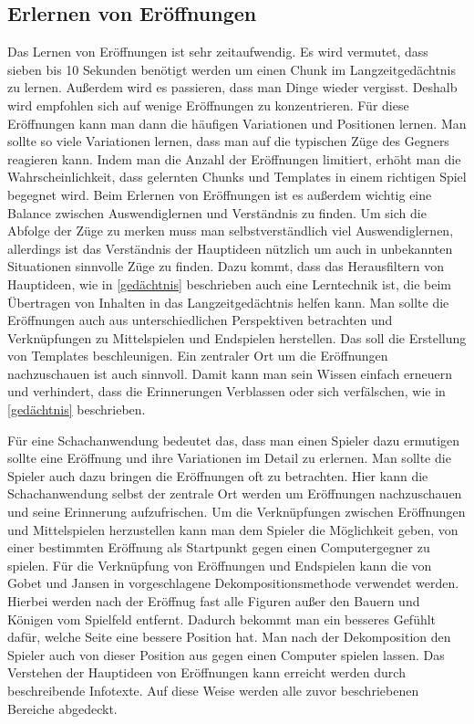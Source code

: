 \subsection{Erlernen von Eröffnungen}
Das Lernen von Eröffnungen ist sehr zeitaufwendig. Es wird vermutet, dass sieben bis 10 Sekunden benötigt werden um einen Chunk im Langzeitgedächtnis zu lernen. Außerdem wird es passieren, dass man Dinge wieder vergisst. Deshalb wird empfohlen sich auf wenige Eröffnungen zu konzentrieren. Für diese Eröffnungen kann man dann die häufigen Variationen und Positionen lernen. Man sollte so viele Variationen lernen, dass man auf die typischen Züge des Gegners reagieren kann. Indem man die Anzahl der Eröffnungen limitiert, erhöht man die Wahrscheinlichkeit, dass gelernten Chunks und Templates in einem richtigen Spiel begegnet wird. Beim Erlernen von Eröffnungen ist es außerdem wichtig eine Balance zwischen Auswendiglernen und Verständnis zu finden. Um sich die Abfolge der Züge zu merken muss man selbstverständlich viel Auswendiglernen, allerdings ist das Verständnis der Hauptideen nützlich um auch in unbekannten Situationen sinnvolle Züge zu finden. Dazu kommt, dass das Herausfiltern von Hauptideen, wie in \autoref{gedächtnis} beschrieben auch eine Lerntechnik ist, die beim Übertragen von Inhalten in das Langzeitgedächtnis helfen kann. Man sollte die Eröffnungen auch aus unterschiedlichen Perspektiven betrachten und Verknüpfungen zu Mittelspielen und Endspielen herstellen. Das soll die Erstellung von Templates beschleunigen. Ein zentraler Ort um die Eröffnungen nachzuschauen ist auch sinnvoll. Damit kann man sein Wissen einfach erneuern und verhindert, dass die Erinnerungen Verblassen oder sich verfälschen, wie in \autoref{gedächtnis} beschrieben.
\cite{gobet_training_2006}

Für eine Schachanwendung bedeutet das, dass man einen Spieler dazu ermutigen sollte eine Eröffnung und ihre Variationen im Detail zu erlernen. Man sollte die Spieler auch dazu bringen die Eröffnungen oft zu betrachten. Hier kann die Schachanwendung selbst der zentrale Ort werden um Eröffnungen nachzuschauen und seine Erinnerung aufzufrischen. Um die Verknüpfungen zwischen Eröffnungen und Mittelspielen herzustellen kann man dem Spieler die Möglichkeit geben, von einer bestimmten Eröffnung als Startpunkt gegen einen Computergegner zu spielen. Für die Verknüpfung von Eröffnungen und Endspielen kann die von Gobet und Jansen in \cite{gobet_training_2006} vorgeschlagene Dekompositionsmethode verwendet werden. Hierbei werden nach der Eröffnug fast alle Figuren außer den Bauern und Königen vom Spielfeld entfernt. Dadurch bekommt man ein besseres Gefühlt dafür, welche Seite eine bessere Position hat. Man nach der Dekomposition den Spieler auch von dieser Position aus gegen einen Computer spielen lassen. Das Verstehen der Hauptideen von Eröffnungen kann erreicht werden durch beschreibende Infotexte. Auf diese Weise werden alle zuvor beschriebenen Bereiche abgedeckt. 

